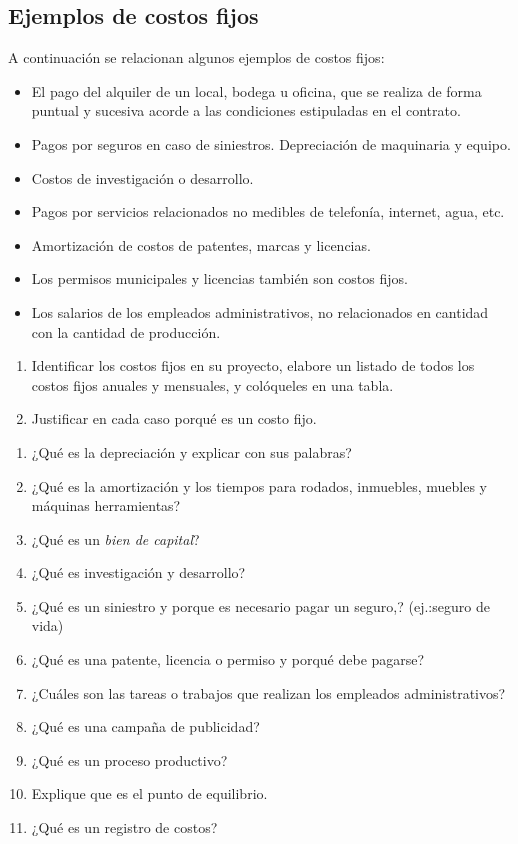 \documentclass[../main]{subfiles}
\begin{document}
\subsection{Ejemplos de costos fijos}
A continuación se relacionan algunos ejemplos de costos fijos:
\begin{itemize}
  \item  El pago del alquiler de un local, bodega u oficina, que se
    realiza de forma puntual y sucesiva acorde a las condiciones
    estipuladas en el contrato.
  \item Pagos por seguros en caso de siniestros.
    Depreciación de maquinaria y equipo.
  \item Costos de investigación o desarrollo.
  \item Pagos por servicios relacionados no medibles de telefonía,
    internet, agua, etc.
  \item Amortización de costos de patentes, marcas y licencias.
  \item Los permisos municipales y licencias también son costos fijos.
  \item Los salarios de los empleados administrativos, no
    relacionados en cantidad con la cantidad de producción.
\end{itemize}
\begin{enumerate}
  \item Identificar los costos fijos en su proyecto, elabore un
    listado de todos los costos fijos anuales y mensuales, y
    colóqueles en una tabla.
  \item Justificar en cada caso porqué es un costo fijo.
\end{enumerate}
\begin{enumerate}
  \item ¿Qué es la depreciación y explicar con sus palabras?
  \item ¿Qué es la amortización y los tiempos para rodados,
    inmuebles, muebles y máquinas herramientas?
  \item ¿Qué es un \emph{bien de capital}?
  \item ¿Qué es investigación y desarrollo?
  \item ¿Qué es un siniestro y porque es necesario pagar un seguro,?
    (ej.:seguro de vida)
  \item ¿Qué es una patente, licencia o permiso y porqué debe pagarse?
  \item ¿Cuáles son las tareas o trabajos que realizan los empleados
    administrativos?
  \item ¿Qué es una campaña de publicidad?
  \item ¿Qué es un proceso productivo?
  \item Explique que es el punto de equilibrio.
  \item ¿Qué es un registro de costos?
\end{enumerate}
\end{document}

